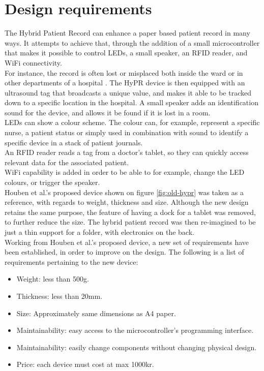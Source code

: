 \section{Design requirements}

The Hybrid Patient Record can enhance a paper based patient record in many ways. It attempts to achieve that, through the addition of a small microcontroller that makes it possible to control LEDs, a small speaker, an RFID reader, and WiFi connectivity. \\

For instance, the record is often lost or misplaced both inside the ward or in other departments of a hospital \cite{hypr}. The HyPR device is then equipped with an ultrasound tag that broadcasts a unique value, and makes it able to be tracked down to a specific location in the hospital. A small speaker adds an identification sound for the device, and allows it be found if it is lost in a room. \\

LEDs can show a colour scheme. The colour can, for example, represent a specific nurse, a patient status or simply used in combination with sound to identify a specific device in a stack of patient journals. \\

An RFID reader reads a tag from a doctor's tablet, so they can quickly access relevant data for the associated patient. \\

WiFi capability is added in order to be able to for example, change the LED colours, or trigger the speaker. \\

Houben et al.'s proposed device shown on figure \ref{fig:old-hypr} was taken as a reference, with regards to weight, thickness and size. Although the new design retains the same purpose, the feature of having a dock for a tablet was removed, to further reduce the size. The hybrid patient record was then re-imagined to be just a thin support for a folder, with electronics on the back. \\

Working from Houben et al.'s proposed device, a new set of requirements have been established, in order to improve on the design. The following is a list of requirements pertaining to the new device:

\begin{itemize} \itemsep0em
	\item Weight: less than 500g.
	\item Thickness: less than 20mm.
	\item Size: Approximately same dimensions as A4 paper.
	\item Maintainability: easy access to the microcontroller's programming interface.
	\item Maintainability: easily change components without changing physical design.
	\item Price: each device must cost at max 1000kr.
\end{itemize}

